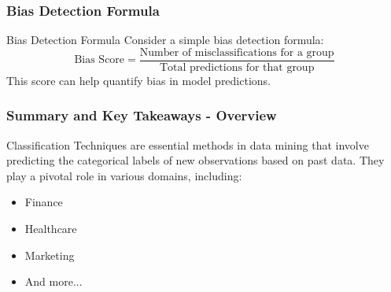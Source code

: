 \documentclass[aspectratio=169]{beamer}
\begin{document}
\begin{frame}[fragile]
    \frametitle{Bias Detection Formula}
    \begin{block}{Bias Detection Formula}
        Consider a simple bias detection formula:
        \begin{equation}
            \text{Bias Score} = \frac{\text{Number of misclassifications for a group}}{\text{Total predictions for that group}}
        \end{equation}
        This score can help quantify bias in model predictions.
    \end{block}
\end{frame}

\begin{frame}[fragile]
    \frametitle{Summary and Key Takeaways - Overview}
    Classification Techniques are essential methods in data mining that involve predicting the categorical labels of new observations based on past data. They play a pivotal role in various domains, including:
    \begin{itemize}
        \item Finance
        \item Healthcare
        \item Marketing
        \item And more...
    \end{itemize}
\end{frame}
\end{document}
